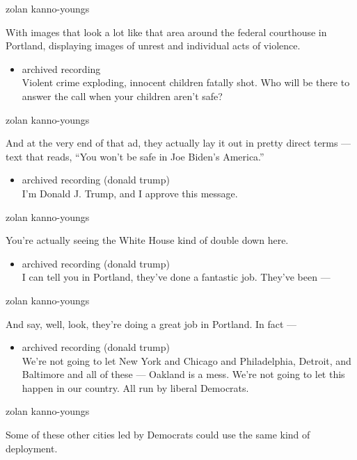 zolan kanno-youngs

With images that look a lot like that area around the federal courthouse
in Portland, displaying images of unrest and individual acts of
violence.

\begin{itemize}
\tightlist
\item
  archived recording\\
  Violent crime exploding, innocent children fatally shot. Who will be
  there to answer the call when your children aren't safe?
\end{itemize}

zolan kanno-youngs

And at the very end of that ad, they actually lay it out in pretty
direct terms --- text that reads, ``You won't be safe in Joe Biden's
America.''

\begin{itemize}
\tightlist
\item
  archived recording (donald trump)\\
  I'm Donald J. Trump, and I approve this message.
\end{itemize}

zolan kanno-youngs

You're actually seeing the White House kind of double down here.

\begin{itemize}
\tightlist
\item
  archived recording (donald trump)\\
  I can tell you in Portland, they've done a fantastic job. They've been
  ---
\end{itemize}

zolan kanno-youngs

And say, well, look, they're doing a great job in Portland. In fact ---

\begin{itemize}
\tightlist
\item
  archived recording (donald trump)\\
  We're not going to let New York and Chicago and Philadelphia, Detroit,
  and Baltimore and all of these --- Oakland is a mess. We're not going
  to let this happen in our country. All run by liberal Democrats.
\end{itemize}

zolan kanno-youngs

Some of these other cities led by Democrats could use the same kind of
deployment.

